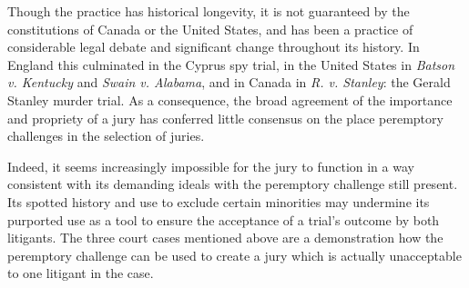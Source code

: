 Though the practice has historical longevity, it is not guaranteed by the constitutions of Canada or the United States, and has
been a practice of considerable legal debate and significant change throughout its history. In England this culminated in the
Cyprus spy trial, in the United States in \textit{Batson v. Kentucky} and \textit{Swain v. Alabama}, and in Canada in
\textit{R. v. Stanley}: the Gerald Stanley  murder trial. As a consequence, the broad agreement of the importance and propriety of
a jury has conferred little consensus on the place peremptory challenges in the selection of juries.

Indeed, it seems increasingly impossible for the jury to function in a way consistent with its demanding ideals with the
peremptory challenge still present. Its spotted history and use to exclude certain minorities may undermine its purported use as a
tool to ensure the acceptance of a trial's outcome by both litigants. The three court cases mentioned above are a demonstration
how the peremptory challenge can be used to create a jury which is actually unacceptable to one litigant in the case.